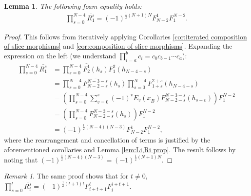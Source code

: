 \documentclass[12pt]{amsart}
\newtheorem{lemma}[theorem]{Lemma}
\theoremstyle{definition}
\theoremstyle{remark}
\newtheorem{remark}[theorem]{Remark}
\numberwithin{equation}{section}
\numberwithin{figure}{section}
\newcommand{\Ri}[2]{\overline{R^{#1}_{#2}}}
\begin{document}
\begin{lemma}\label{lem:prod Ri N-3 N-3}
    The following foam equality holds:
    \begin{align*}
        \prod_{s = 0}^{N-4} \Ri{s}{1} = (-1)^{\frac{1}{2} (N +1)N} F_{N-2}^1 F_{1}^{N-2}.
    \end{align*}
\end{lemma}
\begin{proof}
    This follows from iteratively applying Corollaries \ref{cor:iterated composition of slice morphisms} and \ref{cor:composition of slice morphisms}. Expanding the expression on the left (we understand $\prod_{i = a}^b c_i = c_b c_{b-1}\cdots c_a$):
    \begin{align*}
        \prod_{s = 0}^{N-4} \Ri{s}{1} &=\prod_{s = 0}^{N-4} \overline{F_{2}^1} (h_s)F_{1}^{2} (h_{N - 4-s}) \\
         &= \prod_{s = 0}^{N-4} \overline{F_{N -2 -s}^{N- 3 -s}} (h_s)  \prod_{s = 0}^{N-4} F_{1 + s}^{2 + s} (h_{N - 4-s}) \\
        &=    \left(\prod_{s = 0}^{N-4}\sum_{v = 0}^s(-1)^v E_v(x_{\overline{B}}) F_{N - 2 -s}^{N- 3 -s} (h_{s-v}) \right)  F_1^{N-2} \\
        &=    \left(\prod_{s = 0}^{N-4}F_{N - 2 -s}^{N- 3-s} (h_{s}) \right)  F_1^{N-2} \\
        &=  (-1)^{\frac{1}{2} (N-4)(N-3)} F_{N-2}^1 F_{1}^{N-2},
    \end{align*}
    where the rearrangement and cancellation of terms is justified by the aforementioned corollaries and Lemma \ref{lem:Li,Ri prop}. The result follows by noting that $(-1)^{\frac{1}{2} (N-4)(N-3)} = (-1)^{\frac{1}{2} (N +1)N}$.
\end{proof}
\begin{remark}\label{rmk:Ris generalizeation}
    The same proof shows that for $t\neq 0$, $\prod_{s = 0}^{t} \Ri{s}{i} = (-1)^{\frac{1}{2} (t +1)t} F_{i + t + 1}^i F_{i}^{i + t + 1}$.
\end{remark} 
\end{document}
